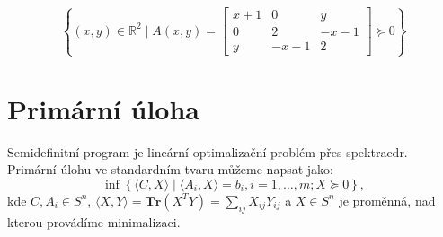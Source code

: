 \begin{pr}
    $$
        \left\{ (x, y) \in \mathbb{R}^2 \mid A(x,y) =
        \begin{bmatrix}
            x + 1 & 0      & y \\
            0     & 2      & -x - 1 \\
            y     & -x - 1 & 2
        \end{bmatrix}
        \succeq 0 \right\}
    $$
\end{pr}

\section{Primární úloha}

Semidefinitní program je lineární optimalizační problém přes spektraedr. Primární úlohu ve standardním tvaru můžeme napsat jako:
\begin{equation}\tag{SDP-P}
    \inf \left\{ \langle C, X \rangle \mid \langle A_i, X \rangle = b_i, i=1, \dots, m; X \succeq 0 \right\},
    \label{eq:SDP-P}
\end{equation}
kde $C, A_i \in S^n$, $\langle X, Y \rangle = \textbf{Tr}(X^T Y) = \sum_{ij} X_{ij}Y_{ij}$ a $X \in S^n$ je proměnná, nad kterou provádíme minimalizaci.

